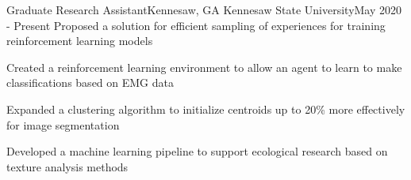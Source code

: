 \resumeSubheading
{Graduate Research Assistant}{Kennesaw, GA}
{Kennesaw State University}{May 2020 - Present}
\resumeItemListStart
\resumeItem
{
    Proposed a solution for efficient sampling of experiences for training
    reinforcement learning models
}

\resumeItem
{
    Created a reinforcement learning environment to allow an
    agent to learn to make classifications based on EMG data
}

\resumeItem
{
    Expanded a clustering algorithm to initialize centroids up to 20\% more effectively for
    image segmentation
}

\resumeItem
{
    Developed a machine learning pipeline to support ecological research based on
    texture analysis methods
}
\resumeItemListEnd



